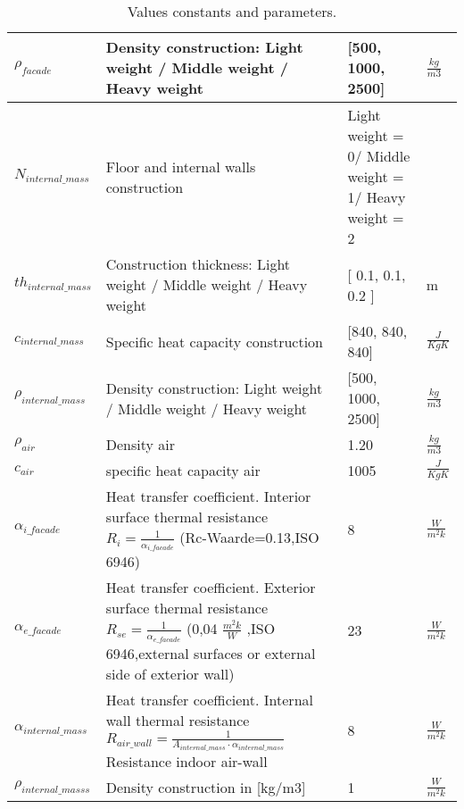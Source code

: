 \begin{table}[H]
\begin{tabular}{|p{3cm}||p{7cm}||p{3cm}||p{3cm}|}
 $\rho_{facade}$& Density construction: Light weight / Middle weight / Heavy weight  & [500, 1000, 2500] &$\frac{kg}{m3}$\\
 \hline
 

 $N_{internal{\_}mass}$& Floor and internal walls construction & Light weight = 0/ Middle weight = 1/ Heavy weight = 2 &\\
 \hline
 
 $th_{internal{\_}mass}$& Construction thickness: Light weight / Middle weight / Heavy weight & [ 0.1,  0.1, 0.2 ] & m \\
 \hline
 
 $c_{internal{\_}mass}$& Specific heat capacity construction & [840, 840, 840] &$\frac{J}{KgK}$\\
 \hline
 
 $\rho_{internal{\_}mass}$& Density construction: Light weight / Middle weight / Heavy weight  & [500, 1000, 2500] &$\frac{kg}{m3}$\\
 \hline
 
 $\rho_{air}$& Density air & 1.20 &$\frac{kg}{m3}$\\
 \hline
  
 $c_{air}$& specific heat capacity air  & 1005 &$\frac{J}{KgK}$\\
 \hline
 
 $\alpha_{i{\_}facade}$ & Heat transfer coefficient. Interior surface thermal resistance $R_{i} =\frac{1}{\alpha_{i{\_}facade}}$  (Rc-Waarde=0.13,ISO 6946) & 8 & $\frac{W}{m^2k}$ \\
 \hline
 
 $\alpha_{e{\_}facade}$ & Heat transfer coefficient. Exterior surface thermal resistance $R_{se} =\frac{1}{\alpha_{e{\_}facade}}$ (0,04 $\frac{m^2k}{W}$ ,ISO 6946,external surfaces or external side of exterior wall) & 23 &$\frac{W}{m^2k}$\\
 \hline
 
 $\alpha_{internal{\_}mass}$& Heat transfer coefficient. Internal wall thermal resistance $ R_{air{\_}wall} = \frac{1}{A_{internal{\_}mass} \cdot \alpha_{internal{\_}mass}} $ Resistance indoor air-wall  & 8 &$\frac{W}{m^2k}$\\
 \hline
 
 $\rho_{internal{\_}masss}$& Density construction in [kg/m3] & 1 &$\frac{W}{m^2k}$\\
 \hline

\end{tabular}

\caption{Values constants and parameters.}
\label{tab:Paramteres}
\end{table}

